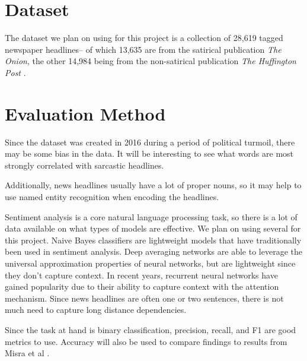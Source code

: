 \documentclass[11pt]{article}
\begin{document}


\section{Dataset}

The dataset we plan on using for this project is a collection of 28,619
tagged newspaper headlines-- of which 13,635 are from the satirical publication
\textit{The Onion}, the other 14,984 being from the non-satirical publication
\textit{The Huffington Post} \cite{misra2023Sarcasm}.



\section{Evaluation Method}

Since the dataset was created in 2016 during a period of political
turmoil, there may be some bias in the data. It will be interesting to see what
words are most strongly correlated with sarcastic headlines.

Additionally, news headlines usually have a lot of proper nouns, so it may
help to use named entity recognition when encoding the headlines.

Sentiment analysis is a core natural language processing task, so there is
a lot of data available on what types of models are effective. We plan on using
several for this project. Naive Bayes classifiers are lightweight models that
have traditionally been used in sentiment analysis. Deep averaging networks are
able to leverage the universal approximation properties of neural networks, but
are lightweight since they don't capture context. In recent years, recurrent
neural networks have gained popularity due to their ability to capture context
with the attention mechanism. Since news headlines are often one or two
sentences, there is not much need to capture long distance dependencies.

Since the task at hand is binary classification, precision, recall, and F1
are good metrics to use. Accuracy will also be used to compare findings to
results from Misra et al \cite{misra2023Sarcasm}.

\printbibliography
\end{document}
